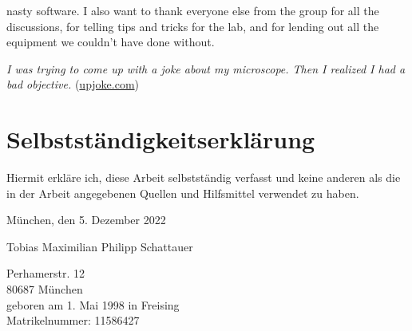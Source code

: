 \begin{minipage}{\textwidth}
nasty software. I also want to thank everyone else from the group for all the discussions, for telling tips and tricks for the lab, and for lending out all the equipment we couldn't have done without.

\begin{center}
    \small
    \textit{I was trying to come up with a joke about my microscope. Then I realized I had a bad objective.} (\href{https://upjoke.com/microscope-jokes}{upjoke.com})
\end{center}
\end{minipage}




\chapter*{Selbstständigkeitserklärung}
Hiermit erkläre ich, diese Arbeit selbstständig verfasst und keine anderen als die in der Arbeit angegebenen Quellen und Hilfsmittel verwendet zu haben.

\vspace{5cm}
München, den 5. Dezember 2022

\vspace{3cm}
Tobias Maximilian Philipp Schattauer

\ifprintversion
Perhamerstr. 12 \\
80687 München \\
geboren am 1. Mai 1998 in Freising \\
Matrikelnummer: 11586427
\fi